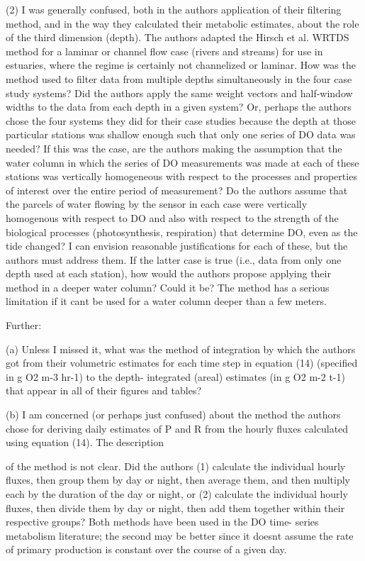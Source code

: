 \documentclass[letterpaper,12pt]{article}\usepackage[]{graphicx}\usepackage[]{color}
\begin{document}
(2) I was generally confused, both in the authors application of their filtering method, and in the way they calculated their metabolic estimates, about the role of the third dimension (depth). The authors adapted the Hirsch et al. WRTDS method for a laminar or channel flow case (rivers and streams) for use in estuaries, where the regime is certainly not channelized or laminar. How was the method used to filter data from multiple depths simultaneously in the four case study
systems? Did the authors apply the same weight vectors and half-window widths to the data from each depth in a given system? Or, perhaps the authors chose the four systems they did for their case studies because the depth at those particular stations was shallow enough such that only one series of DO data was needed? If this was the case, are the authors making the assumption that
the water column in which the series of DO measurements was made at each of these stations was vertically homogeneous with respect to the processes and properties of interest over the entire period of measurement? Do the authors assume that the parcels of water flowing by the sensor in each case were vertically homogenous with respect to DO and also with respect to the strength of the biological processes (photosynthesis, respiration) that determine DO, even as the tide changed? I can envision reasonable justifications for each of these, but the authors must address them. If the latter case is true (i.e., data from only one depth used at each station), how would the authors propose applying their method in a deeper water column? Could it be? The method has a serious limitation if it cant be used for a water column deeper than a few meters.

Further:

(a) Unless I missed it, what was the method of integration by which the authors got from their volumetric estimates for each time step in equation (14) (specified in g O2 m-3 hr-1) to the depth- integrated (areal) estimates (in g O2 m-2 t-1) that appear in all of their figures and tables?

(b) I am concerned (or perhaps just confused) about the method the authors chose for deriving daily estimates of P and R from the hourly fluxes calculated using equation (14). The description
 
of the method is not clear. Did the authors (1) calculate the individual hourly fluxes, then group them by day or night, then average them, and then multiply each by the duration of the day or night, or (2) calculate the individual hourly fluxes, then divide them by day or night, then add them together within their respective groups? Both methods have been used in the DO time- series metabolism literature; the second may be better since it doesnt assume the rate of primary production is constant over the course of a given day.
\end{document}
